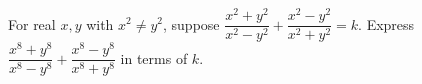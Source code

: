 For real $x,y$ with $x^2\ne y^2$, suppose $\dfrac{x^2+y^2}{x^2-y^2}+\dfrac{x^2-y^2}{x^2+y^2}=k$. Express $\dfrac{x^8+y^8}{x^8-y^8}+\dfrac{x^8-y^8}{x^8+y^8}$ in terms of $k$.
